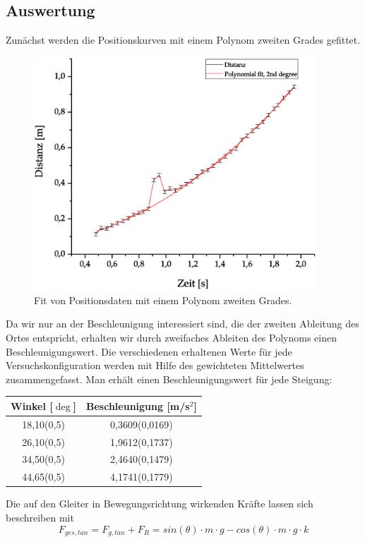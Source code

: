 \documentclass{article}
\begin{document}
\subsection{Auswertung}
Zunächst werden die Positionskurven mit einem Polynom zweiten Grades gefittet.
\begin{figure}[hbt!]
\centering
\includegraphics[width=300pt]{PolynomFit.eps}
\caption{Fit von Positionsdaten mit einem Polynom zweiten Grades.}
\end{figure}
Da wir nur an der Beschleunigung interessiert sind, die der zweiten Ableitung des Ortes entspricht, erhalten wir durch zweifaches Ableiten des Polynoms einen Beschleunigungswert.
Die verschiedenen erhaltenen Werte für jede Versuchskonfiguration werden mit Hilfe des gewichteten Mittelwertes zusammengefasst.
Man erhält einen Beschleunigungswert für jede Steigung:
\begin{center}
\begin{tabular}{|c|c|}
\hline 
Winkel [$\deg$] & Beschleunigung [m/s$^2$] \\ 
\hline 
18,10(0,5) & 0,3609(0,0169) \\ 
\hline 
26,10(0,5) & 1,9612(0,1737) \\ 
\hline 
34,50(0,5) & 2,4640(0,1479) \\ 
\hline 
44,65(0,5) & 4,1741(0,1779) \\ 
\hline 
\end{tabular} 
\end{center}
Die auf den Gleiter in Bewegungsrichtung wirkenden Kräfte lassen sich beschreiben mit
\begin{equation}
F_{ges,tan} = F_{g,tan}+F_R = sin(\theta)\cdot m \cdot g - cos(\theta) \cdot m \cdot g \cdot k
\end{equation}
\end{document}
